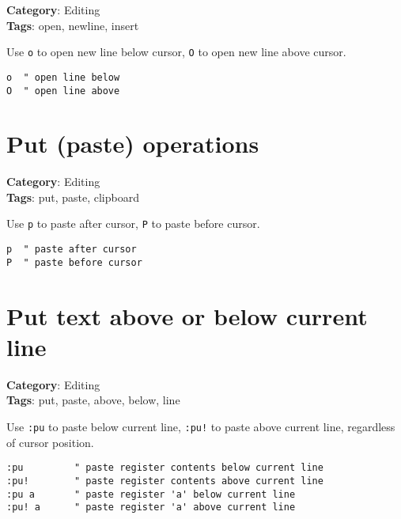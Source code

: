 {{{\textbf{Category}: Editing\\ \textbf{Tags}: open, newline, insert
\vspace{0.5cm}

Use {\footnotesize \Verb§o§} to open new line below cursor, {\footnotesize \Verb§O§} to open new line above cursor.

\begin{Exa*}{}
\begin{Verbatim}[fontsize=\footnotesize, breaklines, breakanywhere]
o  " open line below
O  " open line above
\end{Verbatim}
\end{Exa*}

\section{Put (paste) operations}

\textbf{Category}: Editing\\ \textbf{Tags}: put, paste, clipboard
\vspace{0.5cm}

Use {\footnotesize \Verb§p§} to paste after cursor, {\footnotesize \Verb§P§} to paste before cursor.

\begin{Exa*}{}
\begin{Verbatim}[fontsize=\footnotesize, breaklines, breakanywhere]
p  " paste after cursor
P  " paste before cursor
\end{Verbatim}
\end{Exa*}

\section{Put text above or below current line}

\textbf{Category}: Editing\\ \textbf{Tags}: put, paste, above, below, line
\vspace{0.5cm}

Use {\footnotesize \Verb§:pu§} to paste below current line, {\footnotesize \Verb§:pu!§} to paste above current line, regardless of cursor position.

\begin{Exa*}{}
\begin{Verbatim}[fontsize=\footnotesize, breaklines, breakanywhere]
:pu         " paste register contents below current line
:pu!        " paste register contents above current line
:pu a       " paste register 'a' below current line
:pu! a      " paste register 'a' above current line
\end{Verbatim}
\end{Exa*}

}}}
